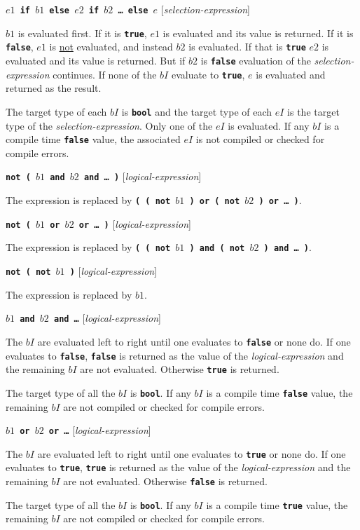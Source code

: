 \documentclass[12pt]{article}
\newcommand{\TT}[1]{{\tt \bfseries #1}}
\newenvironment{indpar}[1][0.3in]%
	{\begin{list}{}%
		     {\setlength{\itemsep}{0in}%
		      \setlength{\topsep}{0in}%
		      \setlength{\parsep}{1ex}%
		      \setlength{\labelwidth}{#1}%
		      \setlength{\leftmargin}{#1}%
		      \addtolength{\leftmargin}{\labelsep}}%
	 \item}%
	{\end{list}}
\begin{document}
\medskip

\TT{$e1$ if $b1$ else $e2$ if $b2$ \ldots{} else $e$}
\hfill [{\em selection-expression}]
\begin{indpar}
$b1$ is evaluated first.  If it is \TT{true}, $e1$ is evaluated and its
value is returned.  If it is \TT{false}, $e1$ is \underline{not}
evaluated, and instead $b2$ is evaluated.  If that is \TT{true}
$e2$ is evaluated and its value is returned.  But if $b2$ is \TT{false}
evaluation of the {\em selection-expression} continues.  If none of
the $bI$ evaluate to \TT{true}, $e$ is evaluated and returned as the result.

The target type of each $bI$ is \TT{bool} and the target type of each
$eI$ is the target type of the {\em selection-expression}.
Only one of the $eI$ is evaluated.  If any $bI$ is a compile time
\TT{false} value, the associated $eI$ is not compiled or checked
for compile errors.
\end{indpar}

\TT{not ( $b1$ and $b2$ and \ldots{} )}
\hfill [{\em logical-expression}]
\begin{indpar}
The expression is replaced by
\TT{( ( not $b1$ ) or ( not $b2$ ) or \ldots{} )}.
\end{indpar}

\TT{not ( $b1$ or $b2$ or \ldots{} )}
\hfill [{\em logical-expression}]
\begin{indpar}
The expression is replaced by
\TT{( ( not $b1$ ) and ( not $b2$ ) and \ldots{} )}.
\end{indpar}

\TT{not ( not $b1$ )}
\hfill [{\em logical-expression}]
\begin{indpar}
The expression is replaced by $b1$.
\end{indpar}

\TT{$b1$ and $b2$ and \ldots{}}
\hfill [{\em logical-expression}]
\begin{indpar}
The $bI$ are evaluated left to right until one evaluates to
\TT{false} or none do.  If one evaluates to \TT{false},
\TT{false} is returned as the value of the {\em logical-expression}
and the remaining $bI$ are not evaluated.
Otherwise \TT{true} is returned.

The target type of all the $bI$ is \TT{bool}.  If any $bI$ is a
compile time \TT{false} value, the remaining $bI$ are not compiled
or checked for compile errors.
\end{indpar}

\TT{$b1$ or $b2$ or \ldots{}}
\hfill [{\em logical-expression}]
\begin{indpar}
The $bI$ are evaluated left to right until one evaluates to
\TT{true} or none do.  If one evaluates to \TT{true},
\TT{true} is returned as the value of the {\em logical-expression}
and the remaining $bI$ are not evaluated.
Otherwise \TT{false} is returned.

The target type of all the $bI$ is \TT{bool}.  If any $bI$ is a
compile time \TT{true} value, the remaining $bI$ are not compiled
or checked for compile errors.
\end{indpar}
\end{document}
